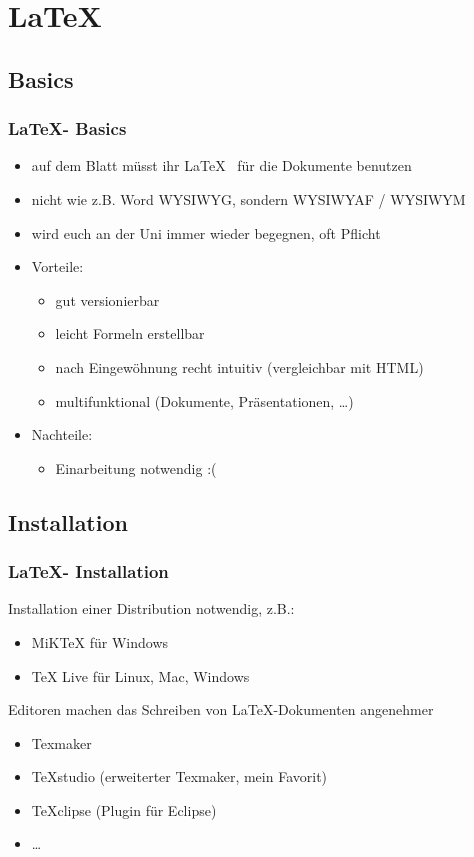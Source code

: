 \documentclass[18pt]{beamer}
\begin{document}
		
\section{\LaTeX}
	\subsection{Basics}
	\begin{frame}
		\frametitle{\LaTeX - Basics}
		\begin{itemize}
			\item auf dem Blatt müsst ihr \LaTeX  ~ für die Dokumente benutzen
			\item nicht wie z.B. Word WYSIWYG, sondern WYSIWYAF / WYSIWYM
			\item wird euch an der Uni immer wieder begegnen, oft Pflicht
			\pause
			\item Vorteile:
			\begin{itemize}
				\item gut versionierbar
				\item leicht Formeln erstellbar
				\item nach Eingewöhnung recht intuitiv (vergleichbar mit HTML)
				\item multifunktional (Dokumente, Präsentationen, \dots)
			\end{itemize}
			\pause
			\item Nachteile:
			\begin{itemize}
				\item Einarbeitung notwendig :(
			\end{itemize}
		\end{itemize}
	\end{frame}
	
	\subsection{Installation}
	\begin{frame}
		\frametitle{\LaTeX - Installation}
		Installation einer Distribution notwendig, z.B.:
		\begin{itemize}
			\item  MiKTeX für Windows
			\item TeX Live für Linux, Mac, Windows
		\end{itemize}
		\pause
		Editoren machen das Schreiben von \LaTeX -Dokumenten angenehmer
		\begin{itemize}
			\item Texmaker
			\item TeXstudio (erweiterter Texmaker, mein Favorit)
			\item TeXclipse (Plugin für Eclipse)
			\item \dots
		\end{itemize}
	\end{frame}
	
\end{document}
